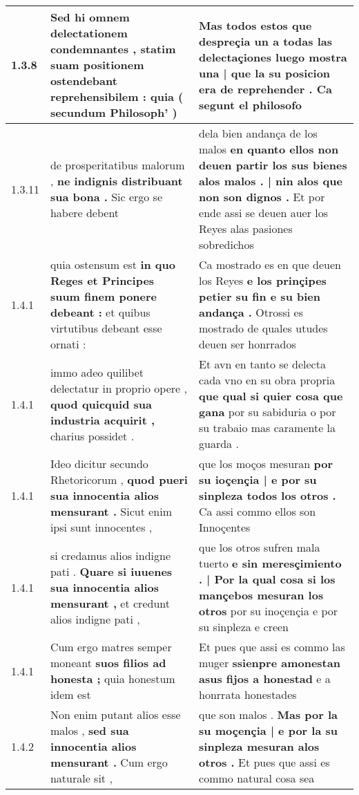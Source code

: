 \begin{tabular}{|p{1cm}|p{6.5cm}|p{6.5cm}|}
1.3.8 & Sed hi omnem delectationem condemnantes , \textbf{ statim suam positionem ostendebant reprehensibilem : } quia ( secundum Philosoph’ ) & Mas todos estos que despreçia un a todas las delectaçiones \textbf{ luego mostra una | que la su posicion era de reprehender . } Ca segunt el philosofo \\\hline
1.3.11 & de prosperitatibus malorum , \textbf{ ne indignis distribuant sua bona . } Sic ergo se habere debent & dela bien andança de los malos \textbf{ en quanto ellos non deuen partir los sus bienes alos malos . | nin alos que non son dignos . } Et por ende assi se deuen auer los Reyes alas pasiones sobredichos \\\hline
1.4.1 & quia ostensum est \textbf{ in quo Reges et Principes suum finem ponere debeant : } et quibus virtutibus debeant esse ornati : & Ca mostrado es en que deuen los Reyes \textbf{ e los prinçipes petier su fin e su bien andança . } Otrossi es mostrado de quales utudes deuen ser honrrados \\\hline
1.4.1 & immo adeo quilibet delectatur in proprio opere , \textbf{ quod quicquid sua industria acquirit , } charius possidet . & Et avn en tanto se delecta cada vno en su obra propria \textbf{ que qual si quier cosa que gana } por su sabiduria o por su trabaio mas caramente la guarda . \\\hline
1.4.1 & Ideo dicitur secundo Rhetoricorum , \textbf{ quod pueri sua innocentia alios mensurant . } Sicut enim ipsi sunt innocentes , & que los moços mesuran \textbf{ por su ioçençia | e por su sinpleza todos los otros . } Ca assi commo ellos son Innoçentes \\\hline
1.4.1 & si credamus alios indigne pati . \textbf{ Quare si iuuenes sua innocentia alios mensurant , } et credunt alios indigne pati , & que los otros sufren mala tuerto \textbf{ e sin meresçimiento . | Por la qual cosa si los mançebos mesuran los otros } por su inoçençia e por su sinpleza e creen \\\hline
1.4.1 & Cum ergo matres semper moneant \textbf{ suos filios ad honesta ; } quia honestum idem est & Et pues que assi es commo las muger \textbf{ ssienpre amonestan asus fijos a honestad } e a honrrata honestades \\\hline
1.4.2 & Non enim putant alios esse malos , \textbf{ sed sua innocentia alios mensurant . } Cum ergo naturale sit , & que son malos . \textbf{ Mas por la su moçençia | e por la su sinpleza mesuran alos otros . } Et pues que assi es commo natural cosa sea \\\hline

\end{tabular}
